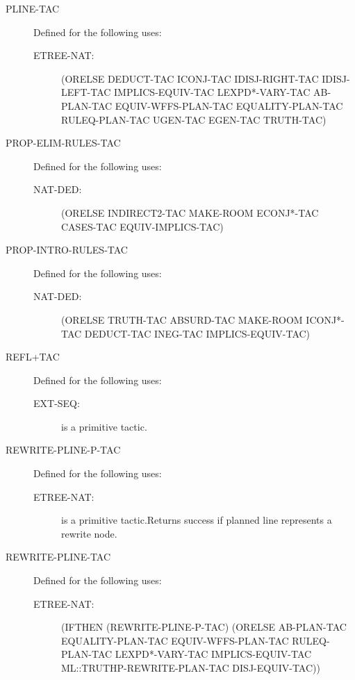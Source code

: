\begin{description}
\begin{description}
\end{description}

\item[PLINE-TAC]  Defined for the following uses:
\begin{description}
\item[ETREE-NAT:] 
(ORELSE DEDUCT-TAC ICONJ-TAC IDISJ-RIGHT-TAC IDISJ-LEFT-TAC
 IMPLICS-EQUIV-TAC LEXPD*-VARY-TAC AB-PLAN-TAC EQUIV-WFFS-PLAN-TAC
 EQUALITY-PLAN-TAC RULEQ-PLAN-TAC UGEN-TAC EGEN-TAC TRUTH-TAC)


\end{description}

\item[PROP-ELIM-RULES-TAC]  Defined for the following uses:
\begin{description}
\item[NAT-DED:] 
(ORELSE INDIRECT2-TAC MAKE-ROOM ECONJ*-TAC CASES-TAC EQUIV-IMPLICS-TAC)


\end{description}

\item[PROP-INTRO-RULES-TAC]  Defined for the following uses:
\begin{description}
\item[NAT-DED:] 
(ORELSE TRUTH-TAC ABSURD-TAC MAKE-ROOM ICONJ*-TAC DEDUCT-TAC INEG-TAC
 IMPLICS-EQUIV-TAC)


\end{description}

\item[REFL+TAC]  Defined for the following uses:
\begin{description}
\item[EXT-SEQ:]  is a primitive tactic.

\end{description}

\item[REWRITE-PLINE-P-TAC]  Defined for the following uses:
\begin{description}
\item[ETREE-NAT:]  is a primitive tactic.Returns success if planned line represents a rewrite node.

\end{description}

\item[REWRITE-PLINE-TAC]  Defined for the following uses:
\begin{description}
\item[ETREE-NAT:] 
(IFTHEN (REWRITE-PLINE-P-TAC)
 (ORELSE AB-PLAN-TAC EQUALITY-PLAN-TAC EQUIV-WFFS-PLAN-TAC
  RULEQ-PLAN-TAC LEXPD*-VARY-TAC IMPLICS-EQUIV-TAC
  ML::TRUTHP-REWRITE-PLAN-TAC DISJ-EQUIV-TAC))



\end{description}
\end{description}
